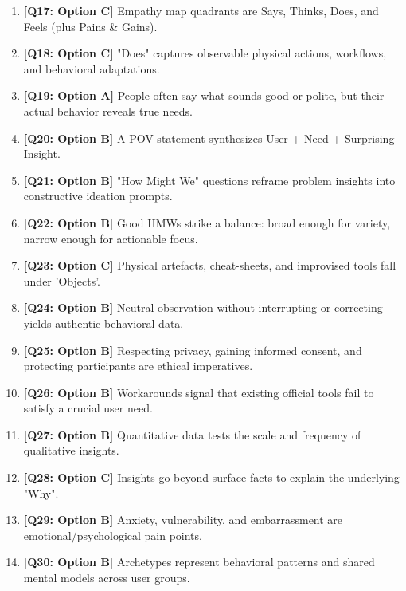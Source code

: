 \begin{expbox}
\begin{enumerate}[leftmargin=6mm, itemsep=2.5mm]
  \item \textbf{[Q17: Option C]} Empathy map quadrants are Says, Thinks, Does, and Feels (plus Pains \& Gains).
  \item \textbf{[Q18: Option C]} "Does" captures observable physical actions, workflows, and behavioral adaptations.
  \item \textbf{[Q19: Option A]} People often say what sounds good or polite, but their actual behavior reveals true needs.
  \item \textbf{[Q20: Option B]} A POV statement synthesizes User + Need + Surprising Insight.
  \item \textbf{[Q21: Option B]} "How Might We" questions reframe problem insights into constructive ideation prompts.
  \item \textbf{[Q22: Option B]} Good HMWs strike a balance: broad enough for variety, narrow enough for actionable focus.
  \item \textbf{[Q23: Option C]} Physical artefacts, cheat-sheets, and improvised tools fall under 'Objects'.
  \item \textbf{[Q24: Option B]} Neutral observation without interrupting or correcting yields authentic behavioral data.
  \item \textbf{[Q25: Option B]} Respecting privacy, gaining informed consent, and protecting participants are ethical imperatives.
  \item \textbf{[Q26: Option B]} Workarounds signal that existing official tools fail to satisfy a crucial user need.
  \item \textbf{[Q27: Option B]} Quantitative data tests the scale and frequency of qualitative insights.
  \item \textbf{[Q28: Option C]} Insights go beyond surface facts to explain the underlying "Why".
  \item \textbf{[Q29: Option B]} Anxiety, vulnerability, and embarrassment are emotional/psychological pain points.
  \item \textbf{[Q30: Option B]} Archetypes represent behavioral patterns and shared mental models across user groups.
\end{enumerate}
\end{expbox}
